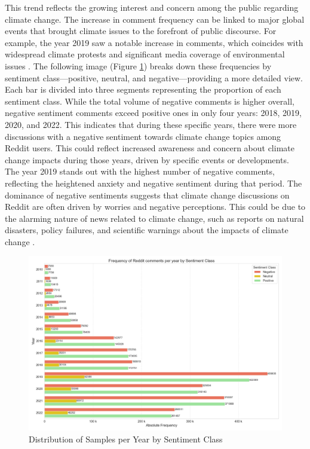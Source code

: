 This trend reflects the growing interest and concern among the public regarding climate change. The increase in comment frequency can be linked to major global events that brought climate issues to the forefront of public discourse. For example, the year 2019 saw a notable increase in comments, which coincides with widespread climate protests and significant media coverage of environmental issues \cite{euronews2023greta}.
The following image (Figure \ref{fig:all_samples_by_class}) breaks down these frequencies by sentiment class—positive, neutral, and negative—providing a more detailed view. Each bar is divided into three segments representing the proportion of each sentiment class. While the total volume of negative comments is higher overall, negative sentiment comments exceed positive ones in only four years: 2018, 2019, 2020, and 2022. This indicates that during these specific years, there were more discussions with a negative sentiment towards climate change topics among Reddit users. This could reflect increased awareness and concern about climate change impacts during those years, driven by specific events or developments. The year 2019 stands out with the highest number of negative comments, reflecting the heightened anxiety and negative sentiment during that period.
The dominance of negative sentiments suggests that climate change discussions on Reddit are often driven by worries and negative perceptions. This could be due to the alarming nature of news related to climate change, such as reports on natural disasters, policy failures, and scientific warnings about the impacts of climate change \cite{earthday2023climate}.
\begin{figure}[h]
    \includegraphics[width=\textwidth]{images/overview/samples_all_by_class.png}
    \caption{Distribution of Samples per Year by Sentiment Class}
    \label{fig:all_samples_by_class}
\end{figure}

